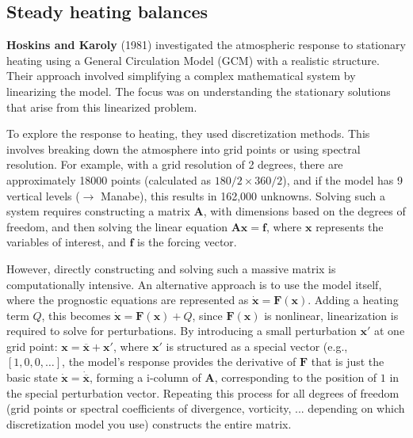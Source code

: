 \subsection{Steady heating balances}
\textbf{Hoskins and Karoly}\cite{Hos81} (1981) investigated the atmospheric response to stationary heating using a General Circulation Model (GCM) with a realistic structure. Their approach involved simplifying a complex mathematical system by linearizing the model. The focus was on understanding the stationary solutions that arise from this linearized problem.

To explore the response to heating, they used discretization methods. This involves breaking down the atmosphere into grid points or using spectral resolution. For example, with a grid resolution of 2 degrees, there are approximately 18000 points (calculated as $180/2×360/2$), and if the model has 9 vertical levels ($\rightarrow$ Manabe), this results in 162,000 unknowns. Solving such a system requires constructing a matrix $\mathbf{A}$, with dimensions based on the degrees of freedom, and then solving the linear equation $\mathbf{A}\mathbf{x}=\mathbf{f}$, where
$\mathbf{x}$ represents the variables of interest, and $\mathbf{f}$ is the forcing vector.

However, directly constructing and solving such a massive matrix is computationally intensive. An alternative approach is to use the model itself, where the prognostic equations are represented as $\mathbf{\dot{x}}=\mathbf{F(x)}$. Adding a heating term $Q$, this becomes $\mathbf{\dot{x}=F(x)}+Q$, since $\mathbf{F(x)}$ is nonlinear, linearization is required to solve for perturbations. By introducing a small perturbation $\mathbf{x'}$ at one grid point: $\mathbf{x=\overline{x}+x'}$, where $\mathbf{x'}$  is structured as a special vector (e.g., $[1,0,0,\dots]$, the model’s response provides the derivative of $\mathbf{F}$ that is just the basic state $\mathbf{\dot{x}=\dot{\overline{x}}}$, forming a i-column of $\mathbf{A}$, corresponding to the position of $1$ in the special perturbation vector. Repeating this process for all degrees of freedom (grid points or spectral coefficients of divergence, vorticity, ... depending on which discretization model you use) constructs the entire matrix.

